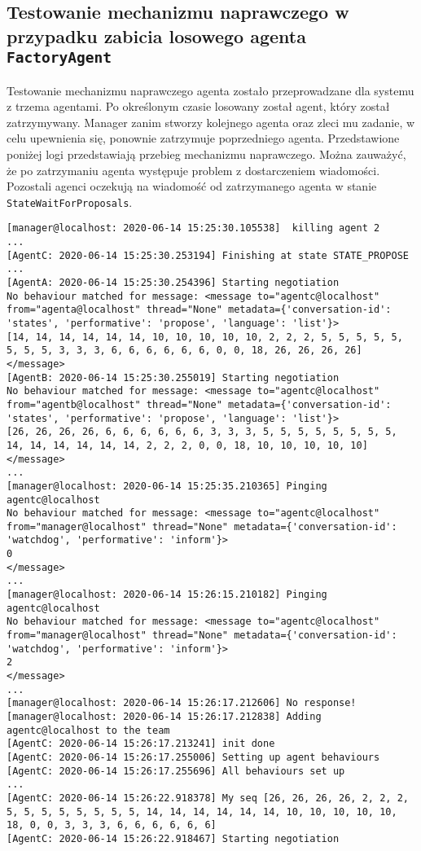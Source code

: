 \subsection{Testowanie mechanizmu naprawczego w przypadku zabicia losowego agenta \texttt{FactoryAgent}} \label{one-kill}
Testowanie mechanizmu naprawczego agenta zostało przeprowadzane dla systemu z trzema agentami. Po określonym czasie losowany został agent, który został zatrzymywany. Manager zanim stworzy kolejnego agenta oraz zleci mu zadanie, w celu upewnienia się, ponownie zatrzymuje poprzedniego agenta. Przedstawione poniżej logi przedstawiają przebieg mechanizmu naprawczego. Można zauważyć, że po zatrzymaniu agenta występuje problem z dostarczeniem wiadomości. Pozostali agenci oczekują na wiadomość od zatrzymanego agenta w stanie \texttt{StateWaitForProposals}.
\begin{lstlisting}
[manager@localhost: 2020-06-14 15:25:30.105538]  killing agent 2
...
[AgentC: 2020-06-14 15:25:30.253194] Finishing at state STATE_PROPOSE
...
[AgentA: 2020-06-14 15:25:30.254396] Starting negotiation
No behaviour matched for message: <message to="agentc@localhost" from="agenta@localhost" thread="None" metadata={'conversation-id': 'states', 'performative': 'propose', 'language': 'list'}>
[14, 14, 14, 14, 14, 14, 10, 10, 10, 10, 10, 2, 2, 2, 5, 5, 5, 5, 5, 5, 5, 5, 3, 3, 3, 6, 6, 6, 6, 6, 6, 0, 0, 18, 26, 26, 26, 26]
</message>
[AgentB: 2020-06-14 15:25:30.255019] Starting negotiation
No behaviour matched for message: <message to="agentc@localhost" from="agentb@localhost" thread="None" metadata={'conversation-id': 'states', 'performative': 'propose', 'language': 'list'}>
[26, 26, 26, 26, 6, 6, 6, 6, 6, 6, 3, 3, 3, 5, 5, 5, 5, 5, 5, 5, 5, 14, 14, 14, 14, 14, 14, 2, 2, 2, 0, 0, 18, 10, 10, 10, 10, 10]
</message>
...
[manager@localhost: 2020-06-14 15:25:35.210365] Pinging agentc@localhost
No behaviour matched for message: <message to="agentc@localhost" from="manager@localhost" thread="None" metadata={'conversation-id': 'watchdog', 'performative': 'inform'}>
0
</message>
...
[manager@localhost: 2020-06-14 15:26:15.210182] Pinging agentc@localhost
No behaviour matched for message: <message to="agentc@localhost" from="manager@localhost" thread="None" metadata={'conversation-id': 'watchdog', 'performative': 'inform'}>
2
</message>
...
[manager@localhost: 2020-06-14 15:26:17.212606] No response!
[manager@localhost: 2020-06-14 15:26:17.212838] Adding agentc@localhost to the team
[AgentC: 2020-06-14 15:26:17.213241] init done
[AgentC: 2020-06-14 15:26:17.255006] Setting up agent behaviours
[AgentC: 2020-06-14 15:26:17.255696] All behaviours set up
...
[AgentC: 2020-06-14 15:26:22.918378] My seq [26, 26, 26, 26, 2, 2, 2, 5, 5, 5, 5, 5, 5, 5, 5, 14, 14, 14, 14, 14, 14, 10, 10, 10, 10, 10, 18, 0, 0, 3, 3, 3, 6, 6, 6, 6, 6, 6]
[AgentC: 2020-06-14 15:26:22.918467] Starting negotiation
\end{lstlisting}
